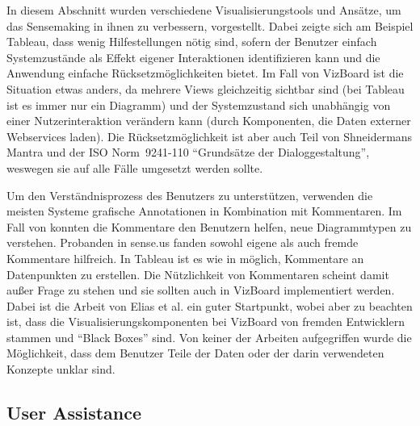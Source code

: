 \documentclass[
	headsepline,
	footsepline,
	fontsize=12pt,
	bibliography=totoc
]{scrbook}
\begin{document}


In diesem Abschnitt wurden verschiedene Visualisierungstools und Ansätze, um das Sensemaking in ihnen zu verbessern, vorgestellt. Dabei zeigte sich am Beispiel Tableau, dass wenig Hilfestellungen nötig sind, sofern der Benutzer einfach Systemzustände als Effekt eigener Interaktionen identifizieren kann und die Anwendung einfache Rücksetzmöglichkeiten bietet. Im Fall von VizBoard ist die Situation etwas anders, da mehrere Views gleichzeitig sichtbar sind (bei Tableau ist es immer nur ein Diagramm) und der Systemzustand sich unabhängig von einer Nutzerinteraktion verändern kann (durch Komponenten, die Daten externer Webservices laden). Die Rücksetzmöglichkeit ist aber auch Teil von Shneidermans Mantra \cite{Shneiderman1996} und der ISO Norm~9241-110 \enquote{Grundsätze der Dialoggestaltung}, weswegen sie auf alle Fälle umgesetzt werden sollte.

Um den Verständnisprozess des Benutzers zu unterstützen, verwenden die meisten Systeme grafische Annotationen in Kombination mit Kommentaren. Im Fall von \cite{Elias2012} konnten die Kommentare den Benutzern helfen, neue Diagrammtypen zu verstehen. Probanden in sense.us fanden sowohl eigene als auch fremde Kommentare hilfreich. In Tableau ist es wie in \cite{Elias2012} möglich, Kommentare an Datenpunkten zu erstellen. Die Nützlichkeit von Kommentaren scheint damit außer Frage zu stehen und sie sollten auch in VizBoard implementiert werden. Dabei ist die Arbeit von Elias et al. ein guter Startpunkt, wobei aber zu beachten ist, dass die Visualisierungskomponenten bei VizBoard von fremden Entwicklern stammen und \enquote{Black Boxes} sind. Von keiner der Arbeiten aufgegriffen wurde die Möglichkeit, dass dem Benutzer Teile der Daten oder der darin verwendeten Konzepte unklar sind.

\subsection{User Assistance}
\end{document}
